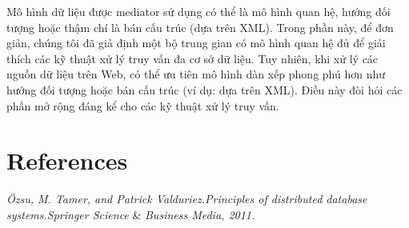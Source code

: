 \documentclass[a4paper]{article}
\begin{document}
Mô hình dữ liệu được mediator sử dụng có thể là mô hình quan hệ, hướng đối tượng hoặc thậm chí là bán cấu trúc (dựa trên XML). Trong phần này, để đơn giản, chúng tôi đã giả định một bộ trung gian có mô hình quan hệ đủ để giải thích các kỹ thuật xử lý truy vấn đa cơ sở dữ liệu. Tuy nhiên, khi xử lý các nguồn dữ liệu trên Web, có thể ưu tiên mô hình dàn xếp phong phú hơn như hướng đối tượng hoặc bán cấu trúc (ví dụ: dựa trên XML). Điều này đòi hỏi các phần mở rộng đáng kể cho các kỹ thuật xử lý truy vấn.
\section {References}
\textit{Özsu, M. Tamer, and Patrick Valduriez.Principles of distributed database systems.Springer Science} \& \textit{Business Media, 2011.}
\end{document}

